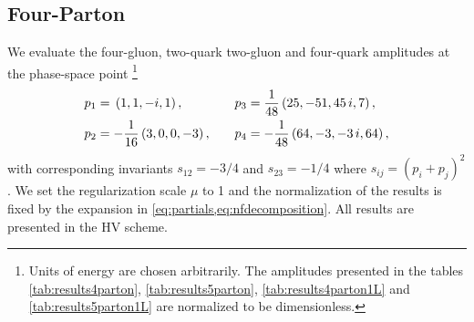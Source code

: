 \subsection{Four-Parton}


We evaluate the four-gluon, two-quark two-gluon and four-quark
amplitudes at the phase-space point%
\footnote{Units of energy are chosen arbitrarily.
  The amplitudes presented in the tables
  \ref{tab:results4parton}, \ref{tab:results5parton}, 
  \ref{tab:results4parton1L} and \ref{tab:results5parton1L}
  are normalized to be dimensionless.
}
%
\begin{equation}
  \begin{aligned}[c]
    p_1 &= \vphantom{\frac{1}{48}}\left(1,1,-i,1\right), \\
    p_2 &= -\frac{1}{16}\left(3,0,0,-3\right), \\
  \end{aligned}
  \qquad
  \begin{aligned}[c]
    p_3 &= \frac{1}{48}\left(25,-51,45\,i,7\right),\\
    p_4 &= -\frac{1}{48}\left(64,-3,-3\,i, 64\right), \\
  \end{aligned}
  \label{eq:EvalPoint4}
\end{equation}
with corresponding invariants $s_{12}=-3/4$ and $s_{23}=-1/4$ 
where $s_{ij}=(p_i+p_j)^2$.
%
We set the regularization scale $\mu$ to 1 and the normalization
of the results is fixed by the expansion in 
\cref{eq:partials,eq:nfdecomposition}. All results are presented
in the HV scheme.
%
